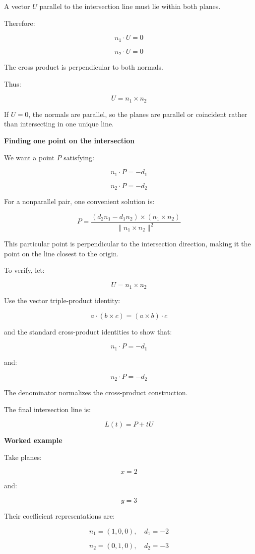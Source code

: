 A vector \(U\) parallel to the intersection line must lie within both planes.

Therefore:

\[
n_1\cdot U=0
\]

\[
n_2\cdot U=0
\]

The cross product is perpendicular to both normals.

Thus:

\[
\boxed{ U=n_1\times n_2 }
\]

If \(U=0\), the normals are parallel, so the planes are parallel or coincident rather than intersecting in one unique line.

\textbf{Finding one point on the intersection}

We want a point \(P\) satisfying:

\[
n_1\cdot P=-d_1
\]

\[
n_2\cdot P=-d_2
\]

For a nonparallel pair, one convenient solution is:

\[
\boxed{ P= \frac{ (d_2n_1-d_1n_2)\times(n_1\times n_2) }{ \|n_1\times n_2\|^2 } }
\]

This particular point is perpendicular to the intersection direction, making it the point on the line closest to the origin.

To verify, let:

\[
U=n_1\times n_2
\]

Use the vector triple-product identity:

\[
a\cdot(b\times c)=(a\times b)\cdot c
\]

and the standard cross-product identities to show that:

\[
n_1\cdot P=-d_1
\]

and:

\[
n_2\cdot P=-d_2
\]

The denominator normalizes the cross-product construction.

The final intersection line is:

\[
\boxed{ L(t)=P+tU }
\]

\textbf{Worked example}

Take planes:

\[
x=2
\]

and:

\[
y=3
\]

Their coefficient representations are:

\[
n_1=(1,0,0),\quad d_1=-2
\]

\[
n_2=(0,1,0),\quad d_2=-3
\]

